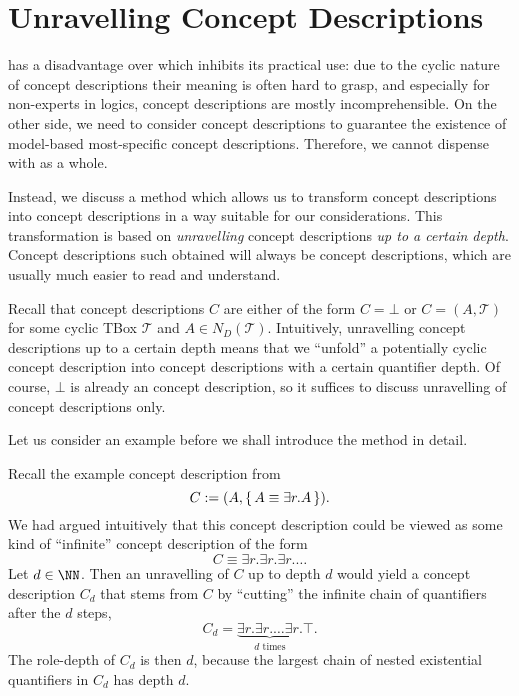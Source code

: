 \section{Unravelling \ELgfpbot Concept Descriptions}
\label{sec:unrav-elgfpb-conc}

\ELgfpbot has a disadvantage over \ELbot which inhibits its practical use: due to the
cyclic nature of \ELgfpbot concept descriptions their meaning is often hard to grasp, and
especially for non-experts in logics, \ELgfpbot concept descriptions are mostly
incomprehensible.  On the other side, we need to consider \ELgfpbot concept descriptions
to guarantee the existence of model-based most-specific concept descriptions.  Therefore,
we cannot dispense with \ELgfpbot as a whole.

Instead, we discuss a method which allows us to transform \ELgfpbot concept descriptions
into \ELbot concept descriptions in a way suitable for our considerations.  This
transformation is based on \emph{unravelling} \ELgfpbot concept descriptions \emph{up to a
certain depth}.  Concept descriptions such obtained will always be \ELbot concept
descriptions, which are usually much easier to read and understand.

Recall that \ELgfpbot concept descriptions $C$ are either of the form $C = \bot$ or $C =
(A, \mathcal{T})$ for some cyclic TBox $\mathcal{T}$ and $A \in N_D(\mathcal{T})$.
Intuitively, unravelling \ELgfpbot concept descriptions up to a certain depth means that
we ``unfold'' a potentially cyclic \ELgfpbot concept description into \ELbot concept
descriptions with a certain quantifier depth.  Of course, $\bot$ is already an \ELbot
concept description, so it suffices to discuss unravelling of \ELgfp concept descriptions
only.

Let us consider an example before we shall introduce the method in detail.

\begin{Example}
  \label{expl:unravelling}
  Recall the example concept description from 
  \begin{equation*}
    C := (A, {\{\, A \equiv \exists r. A \,\}}).
  \end{equation*}
  We had argued intuitively that this concept description could be viewed as some kind of
  ``infinite'' \ELbot concept description of the form
  \begin{equation*}
    C \equiv \exists r. \exists r. \exists r. \dots
  \end{equation*}
  Let $d \in \NN$.  Then an unravelling of $C$ up to depth $d$ would yield a concept
  description $C_d$ that stems from $C$ by ``cutting'' the infinite chain of quantifiers
  after the $d$ steps, \ie
  \begin{equation*}
    C_d = \underbrace{\exists r. \exists r. \dots \exists r.}_{d \text{ times}} \top.
  \end{equation*}
  The role-depth of $C_d$ is then $d$, because the largest chain of nested existential
  quantifiers in $C_d$ has depth $d$.
\end{Example}

